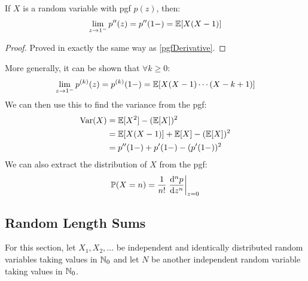 \documentclass[../main.tex]{subfiles}
\begin{document}
\begin{theorem}
  If $X$ is a random variable with pgf $p(z)$, then:
  \[
    \lim_{z \to 1^-} p''(z) = p''(1-) = \mathbb{E}[X(X - 1)]
  \]
\end{theorem}
\begin{proof}
  Proved in exactly the same way as \cref{pgfDerivative}.
\end{proof}
More generally, it can be shown that $\forall k \geq 0$:
\[
  \lim_{z \to 1^-} p^{(k)}(z) = p^{(k)}(1-) = \mathbb{E}[X(X - 1) \cdots (X - k + 1)]
\]
We can then use this to find the variance from the pgf:
\begin{align}
  \operatorname{Var}(X) &= \mathbb{E}[X^2] - (\mathbb{E}[X])^2 \nonumber \\
          &= \mathbb{E}[X(X - 1)] + \mathbb{E}[X] - (\mathbb{E}[X])^2 \nonumber \\
          &= p''(1-) + p'(1-) - (p'(1-))^2 \label{pgfVariance}
\end{align}
We can also extract the distribution of $X$ from the pgf:
\[
  \P(X = n) = \frac{1}{n!}\at{\deriv[n]{p}{z}}{z = 0}
\]
\subsection{Random Length Sums}
\label{randomLengthSums}
For this section, let $X_1, X_2, \ldots$ be independent and identically distributed random variables taking values in $\mathbb{N}_0$ and let $N$ be another independent random variable taking values in $\mathbb{N}_0$.
\end{document}
